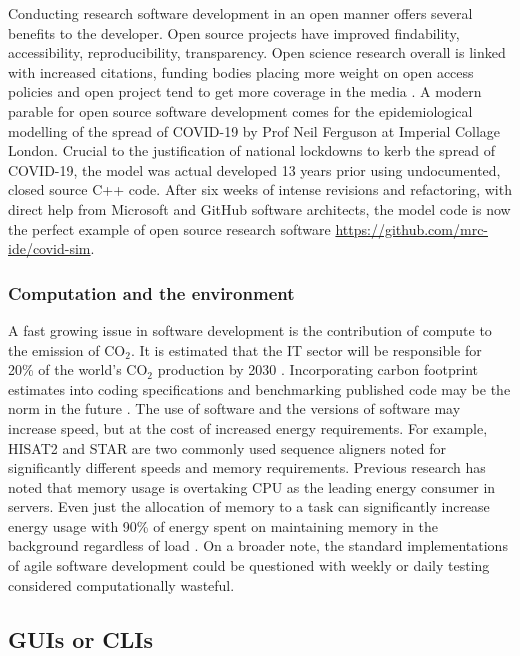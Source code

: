 \documentclass[../main.tex]{subfiles}
\begin{document}
Conducting research software development in an open manner offers several benefits to the developer.
Open source projects have improved findability, accessibility, reproducibility, transparency.
Open science research overall is linked with increased citations, funding bodies placing more weight on open access policies and open project tend to get more coverage in the media \parencite{McKiernan2016}.
A modern parable for open source software development comes for the epidemiological modelling of the spread of COVID-19 by Prof Neil Ferguson at Imperial Collage London.
Crucial to the justification of national lockdowns to kerb the spread of COVID-19, the model was actual developed 13 years prior using undocumented, closed source C++ code.
After six weeks of intense revisions and refactoring, with direct help from Microsoft and GitHub software architects, the model code is now the perfect example of open source research software \url{https://github.com/mrc-ide/covid-sim}.

\subsubsection{Computation and the environment}

A fast growing issue in software development is the contribution of compute to the emission of CO$_2$.
It is estimated that the IT sector will be responsible for 20\% of the world's CO$_2$ production by 2030 \parencite{CCEE2020}. 
Incorporating carbon footprint estimates into coding specifications and benchmarking published code may be the norm in the future \parencite{Lannelongue2021}.
The use of software and the versions of software may increase speed, but at the cost of increased energy requirements.
For example, HISAT2 and STAR are two commonly used sequence aligners noted for significantly different speeds and memory requirements.
Previous research has noted that memory usage is overtaking CPU as the leading energy consumer in servers.
Even just the allocation of memory to a task can significantly increase energy usage with 90\% of energy spent on maintaining memory in the background regardless of load \parencite{Karyakin2017}.
On a broader note, the standard implementations of agile software development could be questioned with weekly or daily testing considered computationally wasteful.



\subsection{GUIs or CLIs}
\end{document}
